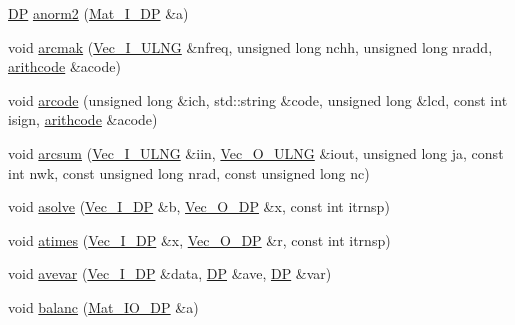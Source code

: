 \begin{DoxyCompactItemize}
\item 
\mbox{\hyperlink{namespaceNR_af6ff762dd605ff477b8e52387253a02a}{DP}} \mbox{\hyperlink{namespaceNR_af5ce2ea46359aa499509ecbaff2c19df}{anorm2}} (\mbox{\hyperlink{namespaceNR_a2b8abfda8fffad6ba0a1b5a4c0773dbf}{Mat\+\_\+\+I\+\_\+\+DP}} \&a)
\item 
void \mbox{\hyperlink{namespaceNR_a3e98d20522b73c2270f4a8ec4676500f}{arcmak}} (\mbox{\hyperlink{namespaceNR_a117570729decc729db86f7655e7a23e5}{Vec\+\_\+\+I\+\_\+\+U\+L\+NG}} \&nfreq, unsigned long nchh, unsigned long nradd, \mbox{\hyperlink{classNR_1_1arithcode}{arithcode}} \&acode)
\item 
void \mbox{\hyperlink{namespaceNR_a7638af127fe6942f24780c5e4c284138}{arcode}} (unsigned long \&ich, std\+::string \&code, unsigned long \&lcd, const int isign, \mbox{\hyperlink{classNR_1_1arithcode}{arithcode}} \&acode)
\item 
void \mbox{\hyperlink{namespaceNR_adea26b3b53b427d36dacd90db22fc5e2}{arcsum}} (\mbox{\hyperlink{namespaceNR_a117570729decc729db86f7655e7a23e5}{Vec\+\_\+\+I\+\_\+\+U\+L\+NG}} \&iin, \mbox{\hyperlink{namespaceNR_a111b6302e9ace403b90a1d801f0c70a2}{Vec\+\_\+\+O\+\_\+\+U\+L\+NG}} \&iout, unsigned long ja, const int nwk, const unsigned long nrad, const unsigned long nc)
\item 
void \mbox{\hyperlink{namespaceNR_a73116d8e72803b4f516bbb3cd7dcd4a0}{asolve}} (\mbox{\hyperlink{namespaceNR_a9f943da53862537c552e2a770cb170ae}{Vec\+\_\+\+I\+\_\+\+DP}} \&b, \mbox{\hyperlink{namespaceNR_a970094d23441f8ef6a45282a7eb2103d}{Vec\+\_\+\+O\+\_\+\+DP}} \&x, const int itrnsp)
\item 
void \mbox{\hyperlink{namespaceNR_a262c43d532c94b65394e128aa2bf565c}{atimes}} (\mbox{\hyperlink{namespaceNR_a9f943da53862537c552e2a770cb170ae}{Vec\+\_\+\+I\+\_\+\+DP}} \&x, \mbox{\hyperlink{namespaceNR_a970094d23441f8ef6a45282a7eb2103d}{Vec\+\_\+\+O\+\_\+\+DP}} \&r, const int itrnsp)
\item 
void \mbox{\hyperlink{namespaceNR_a2a23625f7925fb351b9fb826f5fef1cf}{avevar}} (\mbox{\hyperlink{namespaceNR_a9f943da53862537c552e2a770cb170ae}{Vec\+\_\+\+I\+\_\+\+DP}} \&data, \mbox{\hyperlink{namespaceNR_af6ff762dd605ff477b8e52387253a02a}{DP}} \&ave, \mbox{\hyperlink{namespaceNR_af6ff762dd605ff477b8e52387253a02a}{DP}} \&var)
\item 
void \mbox{\hyperlink{namespaceNR_a2684fb6923e5945cc4197b44eae4df56}{balanc}} (\mbox{\hyperlink{namespaceNR_ad1513aa4697878ed3bff0b8b3c9dd910}{Mat\+\_\+\+I\+O\+\_\+\+DP}} \&a)
\item 

\end{DoxyCompactItemize}
